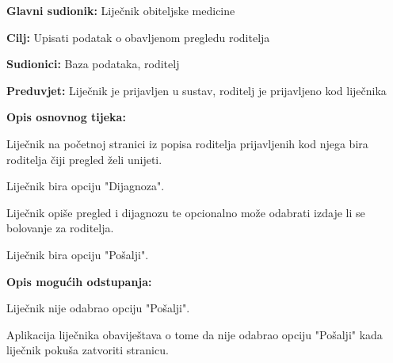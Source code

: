 					\noindent {}
					\begin{packed_item}
						
						\item \textbf{Glavni sudionik: }Liječnik obiteljske medicine
						\item  \textbf{Cilj:} Upisati podatak o obavljenom pregledu roditelja
						\item  \textbf{Sudionici:} Baza podataka, roditelj
						\item  \textbf{Preduvjet:} Liječnik je prijavljen u sustav, roditelj je prijavljeno kod liječnika
						\item  \textbf{Opis osnovnog tijeka:}
						
						\item[] \begin{packed_enum}
							
							\item Liječnik na početnoj stranici iz popisa roditelja prijavljenih kod njega bira roditelja čiji pregled želi unijeti.
							\item Liječnik bira opciju "Dijagnoza".
							\item Liječnik opiše pregled i dijagnozu te opcionalno može odabrati izdaje li se bolovanje za roditelja.
							\item Liječnik bira opciju "Pošalji".
						\end{packed_enum}
						
						\item  \textbf{Opis mogućih odstupanja:}
						
						\item[] \begin{packed_item}
							
							\item[4.a] Liječnik nije odabrao opciju "Pošalji".
							\item[] \begin{packed_enum}
								
								\item Aplikacija liječnika obaviještava o tome da nije odabrao opciju "Pošalji" kada liječnik pokuša zatvoriti stranicu.
							\end{packed_enum}
							
							
						\end{packed_item}
						
						
					\end{packed_item}
					
